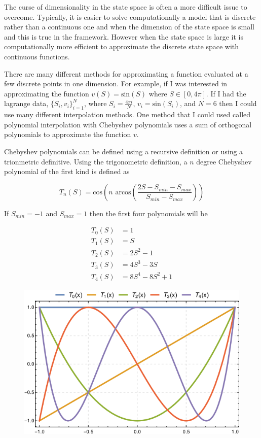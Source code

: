 \documentclass[12pt]{article}
\begin{document}
The curse of dimensionality in the state space is often a more difficult issue to overcome. Typically, it is easier to solve computationally a model that is discrete rather than a continuous one and when the dimension of the state space is small and this is true in the \citet{1995_Erickson_Pakes_RES} framework. However when the state space is large it is computationally more efficient to approximate the discrete state space with continuous functions.

There are many different methods for approximating a function evaluated at a few discrete points in one dimension. For example, if I was interested in approximating the function $v(S)=\text{sin}(S)$ where $S \in [0, 4\pi]$. If I had the lagrange data, $\{S_i,v_i\}_{i=1}^N$, where $S_i=\frac{4\pi i}{N}$, $v_i=\text{sin}(S_i)$, and $N=6$ then I could use many different interpolation methods. One method that I could used called polynomial interpolation with Chebyshev polynomials uses a sum of orthogonal polynomials to approximate the function $v$.

Chebyshev polynomials can be defined using a recursive definition or using a trionmetric definitive. Using the trigonometric definition, a $n$ degree Chebyshev polynomial of the first kind is defined as

\begin{equation*}
  T_n(S)=\text{cos}(n \text{ arcos}(\frac{2S-S_{min}-S_{max}}{S_{min}-S_{max}}))
\end{equation*}

If $S_{min}=-1$ and $S_{max}=1$ then the first four polynomials will be

\begin{equation*}
  \begin{aligned}
    T_0(S)&=1\\
    T_1(S)&=S\\
    T_2(S)&=2S^2-1\\
    T_3(S)&=4S^3-3S\\
    T_4(S)&=8S^4-8S^2+1
  \end{aligned}
\end{equation*}


\begin{figure}[H]
  \centering
  \includegraphics[scale=3]{plot_Chebyshev_Polynomials_of_the_First_Kind}
\end{figure}
\end{document}
